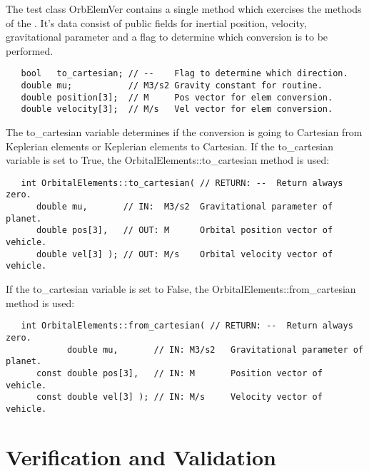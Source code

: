 The test class OrbElemVer contains a single method which exercises the methods of the \OrbitalElement.  It's data consist of public fields for inertial position, velocity, gravitational parameter and a flag to determine which conversion is to be performed.
\begin{verbatim}
   bool   to_cartesian; // --    Flag to determine which direction.
   double mu;           // M3/s2 Gravity constant for routine.
   double position[3];  // M     Pos vector for elem conversion.
   double velocity[3];  // M/s   Vel vector for elem conversion.
\end{verbatim}

The to\_cartesian variable determines if the conversion is going to
Cartesian from Keplerian elements or Keplerian elements to Cartesian.
If the to\_cartesian variable is set to True, the
OrbitalElements::to\_cartesian method is used:
\begin{verbatim}
   int OrbitalElements::to_cartesian( // RETURN: --  Return always zero.
      double mu,       // IN:  M3/s2  Gravitational parameter of planet.
      double pos[3],   // OUT: M      Orbital position vector of vehicle.
      double vel[3] ); // OUT: M/s    Orbital velocity vector of vehicle.
\end{verbatim}

If the to\_cartesian variable is set to False, the
OrbitalElements::from\_cartesian method is used:
\begin{verbatim}
   int OrbitalElements::from_cartesian( // RETURN: --  Return always zero.
            double mu,       // IN: M3/s2   Gravitational parameter of planet.
      const double pos[3],   // IN: M       Position vector of vehicle.
      const double vel[3] ); // IN: M/s     Velocity vector of vehicle.
\end{verbatim}





\chapter{Verification and Validation}\label{ch:ivv}

